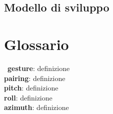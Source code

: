 \documentclass[a4paper,11pt]{article}
\begin{document}
\subsection{Modello di sviluppo}
\newpage

\section*{Glossario}
\ 
\textbf{gesture}: definizione\\ \label{gesture}
\textbf{pairing}: definizione\\ \label{pairing}
\textbf{pitch}: definizione\\ \label{pitch}
\textbf{roll}: definizione\\ \label{roll}
\textbf{azimuth}: definizione\\ \label{azimuth}
\end{document}
